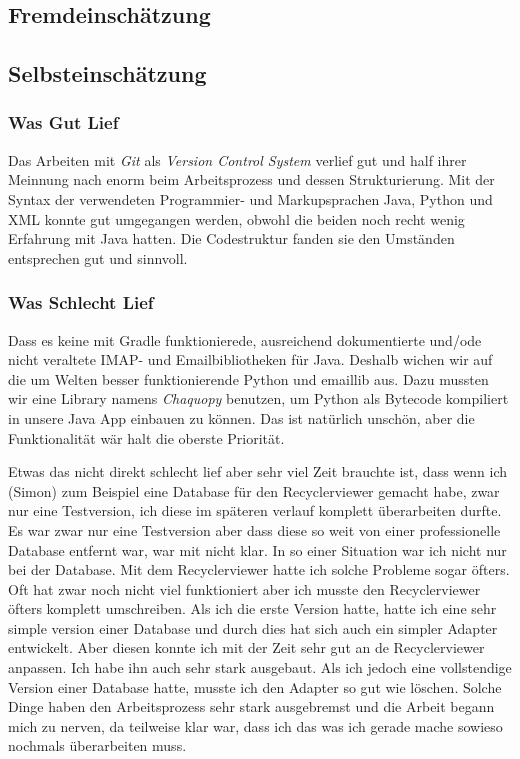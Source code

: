 \documentclass[a4paper,11pt]{article}
\begin{document}
\subsection{Fremdeinschätzung}
\subsection{Selbsteinschätzung}
\subsubsection{Was Gut Lief}
Das Arbeiten mit \textit{Git} als \textit{Version Control System} verlief gut und half ihrer Meinnung nach enorm beim Arbeitsprozess und dessen Strukturierung. Mit der Syntax der verwendeten Programmier- und Markupsprachen Java, Python und XML konnte gut umgegangen werden, obwohl die beiden noch recht wenig Erfahrung mit Java hatten. Die Codestruktur fanden sie den Umständen entsprechen gut und sinnvoll.
\subsubsection{Was Schlecht Lief}
Dass es keine mit Gradle funktionierede, ausreichend dokumentierte und/ode nicht veraltete IMAP- und Emailbibliotheken für Java. Deshalb wichen wir auf die um Welten besser funktionierende Python  und {emaillib} aus. Dazu mussten wir eine Library namens \textit{Chaquopy} benutzen, um Python als Bytecode kompiliert in unsere Java App einbauen zu können. Das ist natürlich unschön, aber die Funktionalität wär halt die oberste Priorität.

Etwas das nicht direkt schlecht lief aber sehr viel Zeit brauchte ist, dass wenn ich (Simon) zum Beispiel eine Database für den Recyclerviewer gemacht habe, zwar nur eine Testversion, 
ich diese im späteren verlauf komplett überarbeiten durfte. Es war zwar nur eine Testversion aber dass diese so weit von einer professionelle Database entfernt war, war mit nicht klar. 
In so einer Situation war ich nicht nur bei der Database. Mit dem Recyclerviewer hatte ich solche Probleme sogar öfters. Oft hat zwar noch nicht viel funktioniert aber ich musste den Recyclerviewer
öfters komplett umschreiben. Als ich die erste Version hatte, hatte ich eine sehr simple version einer Database und durch dies hat sich auch ein simpler Adapter entwickelt. 
Aber diesen konnte ich mit der Zeit sehr gut an de Recyclerviewer anpassen. Ich habe ihn auch sehr stark ausgebaut. Als ich jedoch eine vollstendige Version einer Database hatte, musste ich den 
Adapter so gut wie löschen. Solche Dinge haben den Arbeitsprozess sehr stark ausgebremst und die Arbeit begann mich zu nerven, da teilweise klar war, dass ich das was ich gerade
mache sowieso nochmals überarbeiten muss. 
\end{document}
